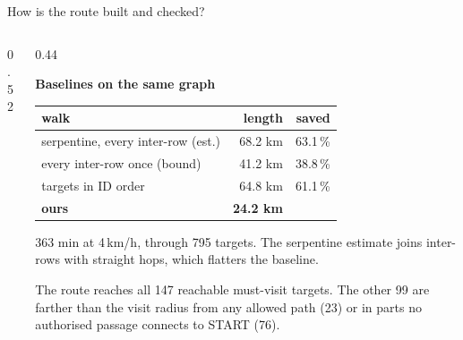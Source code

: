 \begin{frame}{How is the route built and checked?}
  \begin{columns}[T]
    \begin{column}{0.52\textwidth}
    \end{column}
    \begin{column}{0.44\textwidth}
      {\scriptsize\bfseries\color{sxNight} Baselines on the same graph\par}
      \vspace{1.5mm}
      {\scriptsize
      \begin{tabular}{@{}l r r@{}}
        \toprule
        \textbf{walk} & \textbf{length} & \textbf{saved}\\
        \midrule
        serpentine, every inter-row (est.) & 68.2 km & 63.1\,\%\\
        every inter-row once (bound)       & 41.2 km & 38.8\,\%\\
        targets in ID order                & 64.8 km & 61.1\,\%\\
        \textcolor{sxIndigo}{\textbf{ours}} & \textcolor{sxIndigo}{\textbf{24.2 km}} & \\
        \bottomrule
      \end{tabular}\par}
      \vspace{2mm}
      {\tiny\color{sxMuted} 363 min at 4\,km/h, through 795 targets. The serpentine estimate joins inter-rows with straight hops, which flatters the baseline.\par}
      \vspace{2mm}
      {\tiny\color{sxMuted} The route reaches all 147 reachable must-visit targets. The other 99 are farther than the visit radius from any allowed path (23) or in parts no authorised passage connects to START (76).\par}
    \end{column}
  \end{columns}
\end{frame}

